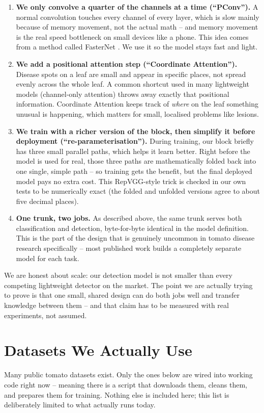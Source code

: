 \documentclass[11pt,a4paper]{article}
\begin{document}
\begin{enumerate}
  \item \textbf{We only convolve a quarter of the channels at a time (``PConv'').}
    A normal convolution touches every channel of every layer, which is slow mainly
    because of memory movement, not the actual math -- and memory movement is the real
    speed bottleneck on small devices like a phone. This idea comes from a method called
    FasterNet \cite{fasternet}. We use it so the model stays fast and light.
  \item \textbf{We add a positional attention step (``Coordinate Attention'').}
    Disease spots on a leaf are small and appear in specific places, not spread evenly
    across the whole leaf. A common shortcut used in many lightweight models
    (channel-only attention) throws away exactly that positional information.
    Coordinate Attention \cite{coordatt} keeps track of \emph{where} on the leaf
    something unusual is happening, which matters for small, localised problems like
    lesions.
  \item \textbf{We train with a richer version of the block, then simplify it before
    deployment (``re-parameterisation'').}
    During training, our block briefly has three small parallel paths, which helps it
    learn better. Right before the model is used for real, those three paths are
    mathematically folded back into one single, simple path -- so training gets the
    benefit, but the final deployed model pays no extra cost. This RepVGG-style trick
    \cite{repvgg} is checked in our own tests to be numerically exact (the folded and
    unfolded versions agree to about five decimal places).
  \item \textbf{One trunk, two jobs.}
    As described above, the same trunk serves both classification and detection,
    byte-for-byte identical in the model definition. This is the part of the design that
    is genuinely uncommon in tomato disease research specifically -- most published work
    builds a completely separate model for each task.
\end{enumerate}

\noindent We are honest about scale: our detection model is not smaller than every
competing lightweight detector on the market. The point we are actually trying to prove
is that one small, shared design can do both jobs well and transfer knowledge between
them -- and that claim has to be measured with real experiments, not assumed.

\section{Datasets We Actually Use}
Many public tomato datasets exist. Only the ones below are wired into working code right
now -- meaning there is a script that downloads them, cleans them, and prepares them for
training. Nothing else is included here; this list is deliberately limited to what
actually runs today.
\end{document}
